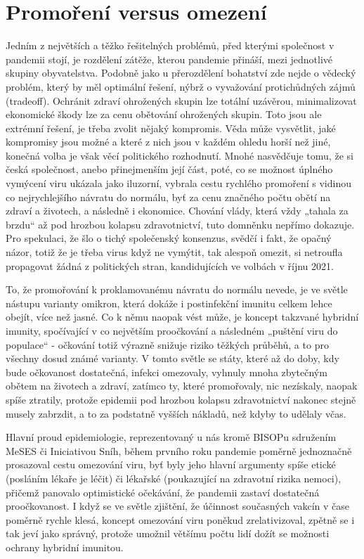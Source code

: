\section*{Promoření versus omezení}

Jedním z největších a těžko řešitelných problémů, před kterými společnost v pandemii stojí, je rozdělení zátěže, kterou pandemie přináší, mezi jednotlivé skupiny obyvatelstva. Podobně jako u přerozdělení bohatství zde nejde o vědecký problém, který by měl optimální řešení, nýbrž o vyvažování protichůdných zájmů (tradeoff). Ochránit zdraví ohrožených skupin lze totální uzávěrou, minimalizovat ekonomické škody lze za cenu obětování ohrožených skupin. Toto jsou ale extrémní řešení, je třeba zvolit nějaký kompromis. Věda může vysvětlit, jaké kompromisy jsou možné a které z nich jsou v každém ohledu horší než jiné, konečná volba je však věcí politického rozhodnutí. 
Mnohé nasvědčuje tomu, že si česká společnost, anebo přinejmenším její část, poté, co se možnost úplného vymýcení viru ukázala jako iluzorní, vybrala cestu rychlého promoření s vidinou co nejrychlejšího návratu do normálu, byť za cenu značného počtu obětí na zdraví a životech, a následně i ekonomice. Chování vlády, která vždy „tahala za brzdu“ až pod hrozbou kolapsu zdravotnictví, tuto domněnku nepřímo dokazuje. Pro spekulaci, že šlo o tichý společenský konsenzus, svědčí i fakt, že opačný názor, totiž že je třeba virus když ne vymýtit, tak alespoň omezit, si netroufla propagovat žádná z politických stran, kandidujících ve volbách v říjnu 2021. 

To, že promořování k proklamovanému návratu do normálu nevede, je ve světle nástupu varianty omikron, která dokáže i postinfekční imunitu celkem lehce obejít, více než jasné. Co k němu naopak vést může, je koncept takzvané hybridní imunity, spočívající v co největším proočkování a následném „puštění viru do populace“ - očkování totiž výrazně snižuje riziko těžkých průběhů, a to pro všechny dosud známé varianty. V tomto světle se státy, které až do doby, kdy bude očkovanost dostatečná, infekci omezovaly, vyhnuly mnoha zbytečným obětem na životech a zdraví, zatímco ty, které promořovaly, nic nezískaly, naopak spíše ztratily,  protože epidemii pod hrozbou kolapsu zdravotnictví nakonec stejně musely zabrzdit, a to za podstatně vyšších nákladů, než kdyby to udělaly včas.

Hlavní proud epidemiologie, reprezentovaný u nás kromě BISOPu sdružením MeSES či Iniciativou Sníh, během prvního roku pandemie poměrně jednoznačně prosazoval cestu omezování viru, byť byly jeho hlavní argumenty spíše etické (posláním lékaře je léčit) či lékařské (poukazující na zdravotní rizika nemoci), přičemž panovalo optimistické očekávání, že pandemii zastaví dostatečná proočkovanost. I když se ve světle zjištění, že účinnost současných vakcín v čase poměrně rychle klesá, koncept omezování viru  poněkud zrelativizoval, zpětně se i tak jeví jako správný, protože umožnil většímu počtu lidí dožít se možnosti ochrany hybridní imunitou. 

